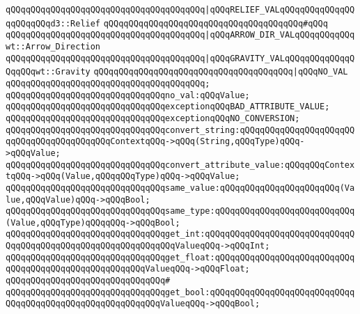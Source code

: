 \verb|qQQqqQQqqQQqqQQqqQQqqQQqqQQqqQQqqQQqqQQq|\verb#|qQQqRELIEF_VALqQQqqQQqqQQqqQQqqQQqqQQqd3::Relief#\newline
\verb|qQQqqQQqqQQqqQQqqQQqqQQqqQQqqQQqqQQqqQQq#qQQq|\newline
\verb|qQQqqQQqqQQqqQQqqQQqqQQqqQQqqQQqqQQqqQQq|\verb#|qQQqARROW_DIR_VALqQQqqQQqqQQqwt::Arrow_Direction#\newline
\verb|qQQqqQQqqQQqqQQqqQQqqQQqqQQqqQQqqQQqqQQq|\verb#|qQQqGRAVITY_VALqQQqqQQqqQQqqQQqqQQqwt::Gravity#\newline
\verb|qQQqqQQqqQQqqQQqqQQqqQQqqQQqqQQqqQQqqQQq|\verb#|qQQqNO_VAL#\newline
\verb|qQQqqQQqqQQqqQQqqQQqqQQqqQQqqQQqqQQqqQQq;|\newline
\newline
\verb|qQQqqQQqqQQqqQQqqQQqqQQqqQQqqQQqno_val:qQQqValue;|\newline
\newline
\verb|qQQqqQQqqQQqqQQqqQQqqQQqqQQqqQQqexceptionqQQqBAD_ATTRIBUTE_VALUE;|\newline
\verb|qQQqqQQqqQQqqQQqqQQqqQQqqQQqqQQqexceptionqQQqNO_CONVERSION;|\newline
\newline
\verb|qQQqqQQqqQQqqQQqqQQqqQQqqQQqqQQqconvert_string:qQQqqQQqqQQqqQQqqQQqqQQqqQQqqQQqqQQqqQQqqQQqContextqQQq->qQQq(String,qQQqType)qQQq->qQQqValue;|\newline
\verb|qQQqqQQqqQQqqQQqqQQqqQQqqQQqqQQqconvert_attribute_value:qQQqqQQqContextqQQq->qQQq(Value,qQQqqQQqType)qQQq->qQQqValue;|\newline
\newline
\verb|qQQqqQQqqQQqqQQqqQQqqQQqqQQqqQQqsame_value:qQQqqQQqqQQqqQQqqQQqqQQq(Value,qQQqValue)qQQq->qQQqBool;|\newline
\verb|qQQqqQQqqQQqqQQqqQQqqQQqqQQqqQQqsame_type:qQQqqQQqqQQqqQQqqQQqqQQqqQQq(Value,qQQqType)qQQqqQQq->qQQqBool;|\newline
\newline
\verb|qQQqqQQqqQQqqQQqqQQqqQQqqQQqqQQqget_int:qQQqqQQqqQQqqQQqqQQqqQQqqQQqqQQqqQQqqQQqqQQqqQQqqQQqqQQqqQQqqQQqValueqQQq->qQQqInt;|\newline
\verb|qQQqqQQqqQQqqQQqqQQqqQQqqQQqqQQqget_float:qQQqqQQqqQQqqQQqqQQqqQQqqQQqqQQqqQQqqQQqqQQqqQQqqQQqqQQqValueqQQq->qQQqFloat;|\newline
\verb|qQQqqQQqqQQqqQQqqQQqqQQqqQQqqQQq#|\newline
\verb|qQQqqQQqqQQqqQQqqQQqqQQqqQQqqQQqget_bool:qQQqqQQqqQQqqQQqqQQqqQQqqQQqqQQqqQQqqQQqqQQqqQQqqQQqqQQqqQQqValueqQQq->qQQqBool;|\newline
